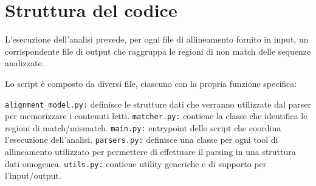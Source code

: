 \documentclass[11pt,italian]{article}
\makeatletter
\newcommand*{\lstitem}[1][]{%
  \setbox0\hbox\bgroup
    \patchcmd{\lst@InlineM}{\@empty}{\@empty\egroup\item[\usebox0]\leavevmode\ignorespaces}{}{}%
    \lstinline[#1]%
}
\makeatother
\begin{document}
\newpage
\section{Struttura del codice}
L'esecuzione dell'analisi prevede, per ogni file di allineamento fornito in input, un corrispondente file di output che raggruppa le regioni di non match delle sequenze analizzate.

\noindent
Lo script è composto da diversi file, ciascuno con la propria funzione specifica:
\begin{description}
  \lstitem{alignment_model.py:} definisce le strutture dati che verranno utilizzate dal parser per memorizzare i contenuti letti.
  \lstitem{matcher.py:} contiene la classe che identifica le regioni di match/mismatch.
  \lstitem{main.py:} entrypoint dello script che coordina l'esecuzione dell'analisi.
  \lstitem{parsers.py:} definisce una classe per ogni tool di allineamento utilizzato per permettere di effettuare il parsing in una struttura dati omogenea.
  \lstitem{utils.py:} contiene utility generiche e di supporto per l'input/output.
\end{description}

% \begin{enumerate}


\end{document}
